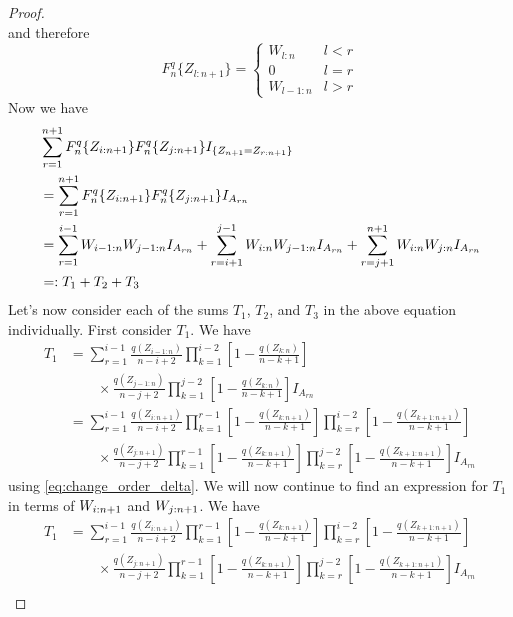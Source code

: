 \begin{proof}
\begin{equation}
\end{equation}
and therefore 
\begin{equation}
F_n^q\{Z_{l:n+1}\} = \begin{cases} 
W_{l:n} & l<r \\
0 & l=r\\
W_{l-1:n} & l>r
\end{cases}
\label{eq:change_order_w}
\end{equation}
%
Now we have
\begin{align}
&  \sum\limits_{r=1}^{n+1}F_n^q\{Z_{i:n+1}\}F_n^q\{Z_{j:n+1}\}I_{\{Z_{n+1}=Z_{r:n+1}\}}\nonumber\\
&= \sum\limits_{r=1}^{n+1}F_n^q\{Z_{i:n+1}\}F_n^q\{Z_{j:n+1}\}I_{A_{rn}}\nonumber\\
&= \sum\limits_{r=1}^{i-1}W_{i-1:n}W_{j-1:n}I_{A_{rn}} + \sum\limits_{r=i+1}^{j-1}W_{i:n}W_{j-1:n}I_{A_{rn}} + \sum\limits_{r=j+1}^{n+1}W_{i:n}W_{j:n}I_{A_{rn}}\nonumber\\
&=: T_1 + T_2 + T_3
\label{eq:sum_t}
\end{align}
%
Let's now consider each of the sums $T_1$, $T_2$, and $T_3$ in the above equation individually. First consider $T_1$. We have
\begin{align*}
T_1 &= \sum\limits_{r=1}^{i-1} \frac{q(Z_{i-1:n})}{n-i+2} \prod\limits_{k=1}^{i-2}\left[1-\frac{q(Z_{k:n})}{n-k+1}\right]\\
    &\qquad \times \frac{q(Z_{j-1:n})}{n-j+2} \prod\limits_{k=1}^{j-2}\left[1-\frac{q(Z_{k:n})}{n-k+1}\right]I_{A_{rn}}\\
	&= \sum\limits_{r=1}^{i-1} \frac{q(Z_{i:n+1})}{n-i+2} \prod_{k=1}^{r-1}\left[1-\frac{q(Z_{k:n+1})}{n-k+1}\right]\prod_{k=r}^{i-2}\left[1-\frac{q(Z_{k+1:n+1})}{n-k+1}\right]\\
	&\qquad \times \frac{q(Z_{j:n+1})}{n-j+2} \prod_{k=1}^{r-1}\left[1-\frac{q(Z_{k:n+1})}{n-k+1}\right]\prod_{k=r}^{j-2}\left[1-\frac{q(Z_{k+1:n+1})}{n-k+1}\right]I_{A_{rn}}
\end{align*}
using \eqref{eq:change_order_delta}. We will now continue to find an expression for $T_1$ in terms of $W_{i:n+1}$ and $W_{j:n+1}$. We have
\begin{align*}		
	T_1	&= \sum\limits_{r=1}^{i-1} \frac{q(Z_{i:n+1})}{n-i+2} \prod_{k=1}^{r-1}\left[1-\frac{q(Z_{k:n+1})}{n-k+1}\right]\prod_{k=r}^{i-2}\left[1-\frac{q(Z_{k+1:n+1})}{n-k+1}\right]\\
		& \qquad \times \frac{q(Z_{j:n+1})}{n-j+2} \prod_{k=1}^{r-1}\left[1-\frac{q(Z_{k:n+1})}{n-k+1}\right]\prod_{k=r}^{j-2}\left[1-\frac{q(Z_{k+1:n+1})}{n-k+1}\right]I_{A_{rn}}\\

\end{align*}
\end{proof}
